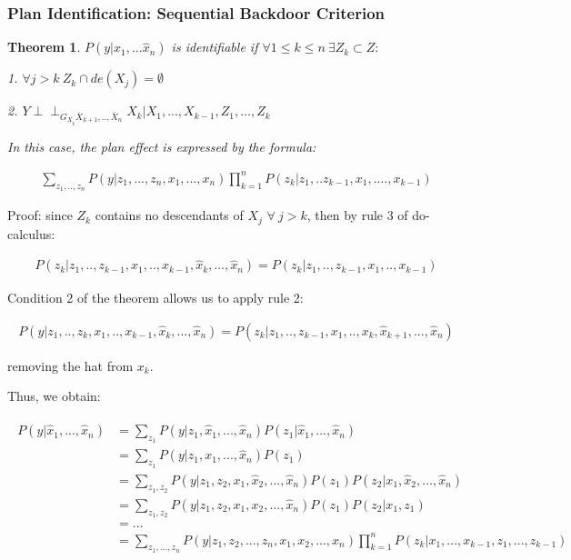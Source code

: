 \documentclass[fleqn]{article}
\newcommand{\independent}{\perp \!\!\! \perp}
\newtheorem{theorem}{Theorem}
\numberwithin{equation}{section}
\numberwithin{theorem}{section}
\numberwithin{figure}{section}
\numberwithin{lemma}{section}
\numberwithin{corollary}{section}
\begin{document}
\subsubsection*{Plan Identification: Sequential Backdoor Criterion}

\begin{theorem}
	$P(y|\hat x_1, ...\hat x_n)$ is identifiable if $\forall 1 \le k \le n \ \exists Z_k \subset Z:$ 
	
	1. $ \forall j > k \ Z_k \cap de(X_j) = \emptyset$
	
	2. $Y \independent_{G_{\underline{X}_k}\overline{X}_{k+1},..,\overline{X}_n} X_k | X_1, ..., X_{k-1}, Z_1, ..., Z_k$
	
	In this case, the plan effect is expressed by the formula:
	
	\begin{align}
		\sum\limits_{z_1,..,z_n}P(y|z_1,...,z_n,x_1,...,x_n)\prod\limits_{k=1}^nP(z_k|z_1,..z_{k-1}, x_1,....,x_{k-1})
	\end{align}
\end{theorem}

Proof: since $Z_k$ contains no descendants of $X_j$ $\forall \ j > k$, then by rule 3 of do-calculus:

\begin{align}
	P(z_k|z_1,..,z_{k-1},x_1,..,x_{k-1}, \hat x_k, ...,\hat x_n) = P(z_k|z_1,..,z_{k-1},x_1,..,x_{k-1}) 
\end{align}

Condition 2 of the theorem allows us to apply rule 2:

\begin{align}
	P(y|z_1,..,z_{k},x_1,..,x_{k-1}, \hat x_k, ...,\hat x_n) = P(z_k|z_1,..,z_{k-1},x_1,..,x_k,\hat x_{k+1},...,\hat x_n) 
\end{align}

removing the hat from $x_k$.

Thus, we obtain:

\begin{align}
	\begin{split}
		P(y|\hat x_1,...,\hat x_n) &= \sum\limits_{z_1}P(y|z_1,\hat x_1,...,\hat x_n)P(z_1|\hat x_1,...,\hat x_n) \\
		&=  \sum\limits_{z_1}P(y|z_1, x_1,...,\hat x_n)P(z_1) \\
		&= \sum\limits_{z_1,z_2}P(y|z_1, z_2, x_1, \hat x_2,...,\hat x_n)P(z_1)P(z_2|x_1,\hat x_2,...,\hat x_n) \\
		&=\sum\limits_{z_1,z_2}P(y|z_1, z_2, x_1, x_2,...,\hat x_n)P(z_1)P(z_2|x_1,z_1)\\
		&= \ldots \\
		&= \sum\limits_{z_1,...,z_n}P(y|z_1, z_2, ..., z_n, x_1, x_2,...,x_n)\prod\limits_{k=1}^nP(z_k|x_1,...,x_{k-1},z_1,...,z_{k-1})
	\end{split}
\end{align}
\end{document}
